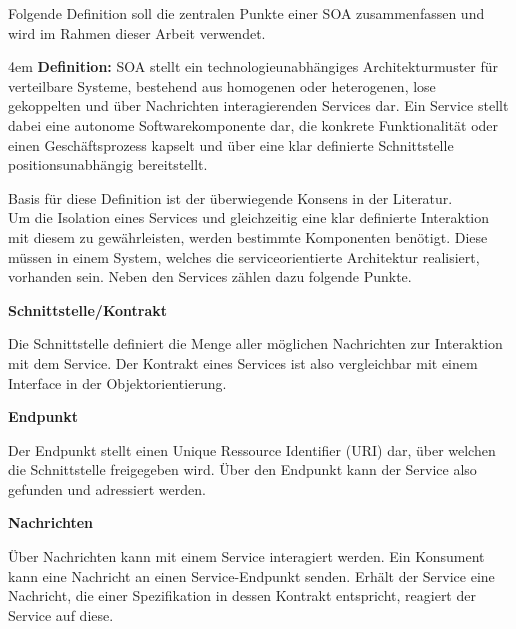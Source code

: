 Folgende Definition soll die zentralen Punkte einer SOA zusammenfassen und wird im Rahmen dieser Arbeit verwendet.\\
\par
\begingroup
\leftskip4em
\rightskip\leftskip
    \textbf{Definition:} SOA stellt ein technologieunabhängiges Architekturmuster für verteilbare Systeme, bestehend aus homogenen oder heterogenen, lose gekoppelten und über Nachrichten interagierenden Services dar. Ein Service stellt dabei eine autonome Softwarekomponente dar, die konkrete Funktionalität oder einen Geschäftsprozess kapselt und über eine klar definierte Schnittstelle positionsunabhängig bereitstellt.\\
\par
\endgroup
Basis für diese Definition ist der überwiegende Konsens in der Literatur.\\
Um die Isolation eines Services und gleichzeitig eine klar definierte Interaktion mit diesem zu gewährleisten, werden bestimmte Komponenten benötigt. Diese müssen in einem System, welches die serviceorientierte Architektur realisiert, vorhanden sein. Neben den Services zählen dazu folgende Punkte. \cite{ROTEMGALOZ.2012}

\textbf{Schnittstelle/Kontrakt}

Die Schnittstelle definiert die Menge aller möglichen Nachrichten zur Interaktion mit dem Service. Der Kontrakt eines Services ist also vergleichbar mit einem Interface in der Objektorientierung.


\textbf{Endpunkt}

Der Endpunkt stellt einen Unique Ressource Identifier (URI) dar, über welchen die Schnittstelle freigegeben wird. Über den Endpunkt kann der Service also gefunden und adressiert werden.

\textbf{Nachrichten}

Über Nachrichten kann mit einem Service interagiert werden. Ein Konsument kann eine Nachricht an einen Service-Endpunkt senden. Erhält der Service eine Nachricht, die einer Spezifikation in dessen Kontrakt entspricht, reagiert der Service auf diese.

